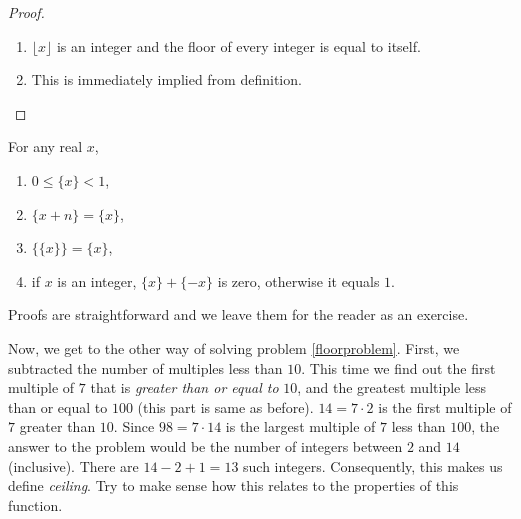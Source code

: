 \documentclass[12pt]{subfile}
\begin{document}
\begin{proof}
\begin{enumerate}[1.]
        		\item $\lfloor x\rfloor$ is an integer and the floor of every integer is equal to itself.
        		\item This is immediately implied from definition.
        	\end{enumerate}
        \end{proof}

	    \begin{proposition}
	    	For any real $x$,
	    	\begin{enumerate}[1.]
	    		\item $0\leq\{x\}<1$,
	    		\item  $\{ x+n\}=\{ x\}$,
	    		\item $\{\{x\}\} =  \{x\}$,
	    		\item if $x$ is an integer, $\{ x\}+\{ -x\}$ is zero, otherwise it equals $1$.
	    	\end{enumerate}
	    \end{proposition}

	    Proofs are straightforward and we leave them for the reader as an exercise.


    Now, we get to the other way of solving problem \ref{floorproblem}. First, we subtracted the number of multiples less than $10$. This time we find out the first multiple of $7$ that is \textit{greater than or equal to} $10$, and the greatest multiple less than or equal to $100$ (this part is same as before). $14=7\cdot2$ is the first multiple of $7$ greater than $10$. Since $98=7\cdot14$ is the largest multiple of $7$ less than $100$, the answer to the problem would be the number of integers between $2$ and $14$ (inclusive). There are $14-2+1=13$ such integers. Consequently, this makes us define \textit{ceiling}. Try to make sense how this relates to the properties of this function.
\end{document}
